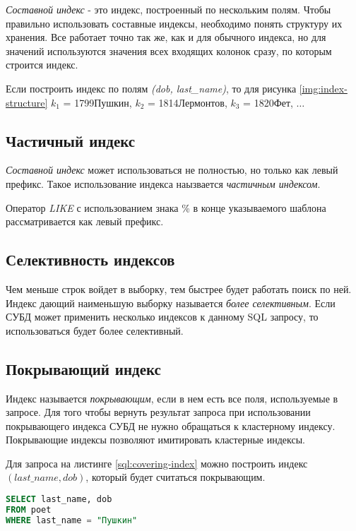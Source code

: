 \textit{Составной индекс} - это индекс, построенный по нескольким полям. Чтобы правильно использовать составные индексы, необходимо понять структуру их хранения. Все работает точно так же, как и для обычного индекса, но для значений используются значения всех входящих колонок сразу, по которым строится индекс.

Если построить индекс по полям \textit{(dob, last_name)}, то для рисунка \ref{img:index-structure} $k_1$ = 1799Пушкин, $k_2$ = 1814Лермонтов, $k_3$ = 1820Фет, $\ldots$

\subsection{Частичный индекс}

\textit{Составной индекс} может использоваться не полностью, но только как левый префикс. Такое использование индекса наызвается \textit{частичным индексом}. 

Оператор \textit{LIKE} с использованием знака \% в конце указываемого шаблона рассматривается как левый префикс.

\subsection{Селективность индексов}

Чем меньше строк войдет в выборку, тем быстрее будет работать поиск по ней. Индекс дающий наименьшую выборку называется \textit{более селективным}. Если СУБД может применить несколько индексов к данному SQL запросу, то использоваться будет более селективный.

\subsection{Покрывающий индекс}
\label{section:covering-index}

Индекс называется \textit{покрывающим}, если в нем есть все поля, используемые в запросе. Для того чтобы вернуть результат запроса при использовании покрывающего индекса СУБД не нужно обращаться к кластерному индексу. Покрывающие индексы позволяют имитировать кластерные индексы. 

Для запроса на листинге \ref{sql:covering-index} можно построить индекс $(last\_name, dob)$, который будет считаться покрывающим.
\begin{lstlisting}[language=sql, label=sql:covering-index, caption={запрос для covering-index}]
SELECT last_name, dob
FROM poet
WHERE last_name = "Пушкин"
\end{lstlisting}

